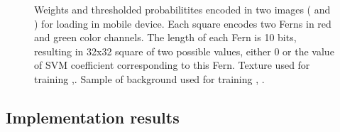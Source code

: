 \documentclass[10pt,twocolumn, a4paper]{article}
\begin{document}
\begin{figure}[t]
    \caption{Weights and thresholded probabilitites encoded in two images (\protect {} and \protect{}) for loading in mobile device. Each square encodes two Ferns in red and green color channels. The length of each Fern is 10 bits, resulting in 32x32 square of two possible values, either 0 or the value of SVM coefficient corresponding to this Fern. \protect {} Texture used for training \protect {},\protect {}. \protect {} Sample of background used for training \protect {}, \protect {}.}
    \label{TSamples1}
\end{figure}

\subsection{Implementation results}
\label{iresults}
\end{document}
